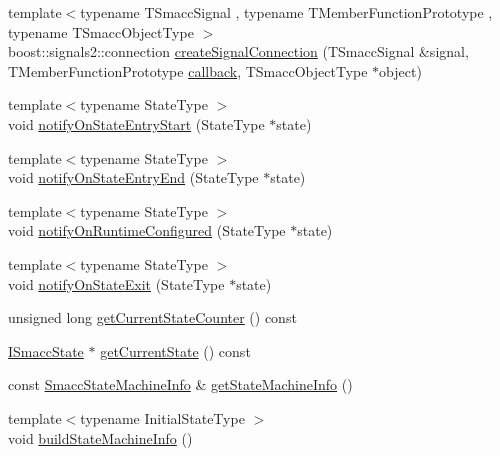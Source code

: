 \begin{DoxyCompactItemize}
\item 
{\footnotesize template$<$typename T\+Smacc\+Signal , typename T\+Member\+Function\+Prototype , typename T\+Smacc\+Object\+Type $>$ }\\boost\+::signals2\+::connection \hyperlink{classsmacc_1_1ISmaccStateMachine_adf0f42ade0c65cc471960fe2a7c42da2}{create\+Signal\+Connection} (T\+Smacc\+Signal \&signal, T\+Member\+Function\+Prototype \hyperlink{3_2servers_2opencv__perception__node_2opencv__perception__node_8cpp_a050e697bd654facce10ea3f6549669b3}{callback}, T\+Smacc\+Object\+Type $\ast$object)
\item 
{\footnotesize template$<$typename State\+Type $>$ }\\void \hyperlink{classsmacc_1_1ISmaccStateMachine_aeec54e997d715b105ebfeb5caadc4fbf}{notify\+On\+State\+Entry\+Start} (State\+Type $\ast$state)
\item 
{\footnotesize template$<$typename State\+Type $>$ }\\void \hyperlink{classsmacc_1_1ISmaccStateMachine_a856cf2d25d84659b974cccfbf44aeec9}{notify\+On\+State\+Entry\+End} (State\+Type $\ast$state)
\item 
{\footnotesize template$<$typename State\+Type $>$ }\\void \hyperlink{classsmacc_1_1ISmaccStateMachine_a7377ca0f79289fdc27f9ed3ff6e67263}{notify\+On\+Runtime\+Configured} (State\+Type $\ast$state)
\item 
{\footnotesize template$<$typename State\+Type $>$ }\\void \hyperlink{classsmacc_1_1ISmaccStateMachine_a9d2bd4aca0c80a1ec22c5f95e7c38db8}{notify\+On\+State\+Exit} (State\+Type $\ast$state)
\item 
unsigned long \hyperlink{classsmacc_1_1ISmaccStateMachine_aad27c0182b53245d0aded22e63cd83bd}{get\+Current\+State\+Counter} () const
\item 
\hyperlink{classsmacc_1_1ISmaccState}{I\+Smacc\+State} $\ast$ \hyperlink{classsmacc_1_1ISmaccStateMachine_a610d09dc5341fb63732be713c21fbe86}{get\+Current\+State} () const
\item 
const \hyperlink{classsmacc_1_1introspection_1_1SmaccStateMachineInfo}{Smacc\+State\+Machine\+Info} \& \hyperlink{classsmacc_1_1ISmaccStateMachine_a3b1facb0477325fe43b447fc21d9eb7d}{get\+State\+Machine\+Info} ()
\item 
{\footnotesize template$<$typename Initial\+State\+Type $>$ }\\void \hyperlink{classsmacc_1_1ISmaccStateMachine_a8e9c16ed0dc3dfc878548a8c6f3c47d7}{build\+State\+Machine\+Info} ()
\end{DoxyCompactItemize}
